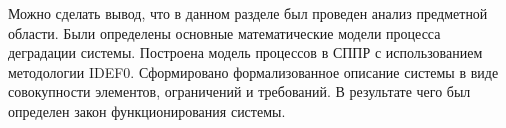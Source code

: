 
Можно сделать вывод, что в данном разделе был проведен анализ предметной области. 
Были определены основные математические модели процесса деградации системы. 
Построена модель процессов в СППР с использованием методологии IDEF0. 
Сформировано формализованное описание системы в виде совокупности элементов, ограничений и требований. 
В результате чего был определен закон функционирования системы.






